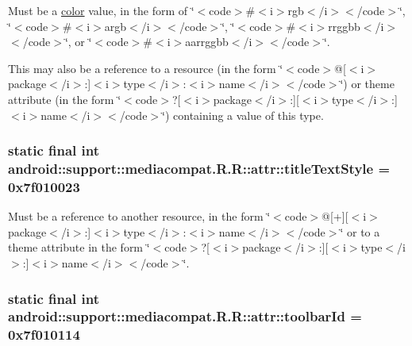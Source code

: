 Must be a \hyperlink{classandroid_1_1support_1_1mediacompat_1_1_r_1_1color}{color} value, in the form of \char`\"{}$<$code$>$\#$<$i$>$rgb$<$/i$>$$<$/code$>$\char`\"{}, \char`\"{}$<$code$>$\#$<$i$>$argb$<$/i$>$$<$/code$>$\char`\"{}, \char`\"{}$<$code$>$\#$<$i$>$rrggbb$<$/i$>$$<$/code$>$\char`\"{}, or \char`\"{}$<$code$>$\#$<$i$>$aarrggbb$<$/i$>$$<$/code$>$\char`\"{}. 

This may also be a reference to a resource (in the form \char`\"{}$<$code$>$@\mbox{[}$<$i$>$package$<$/i$>$:\mbox{]}$<$i$>$type$<$/i$>$:$<$i$>$name$<$/i$>$$<$/code$>$\char`\"{}) or theme attribute (in the form \char`\"{}$<$code$>$?\mbox{[}$<$i$>$package$<$/i$>$:\mbox{]}\mbox{[}$<$i$>$type$<$/i$>$:\mbox{]}$<$i$>$name$<$/i$>$$<$/code$>$\char`\"{}) containing a value of this type. \hypertarget{classandroid_1_1support_1_1mediacompat_1_1_r_1_1attr_0609b590ea704bb265fe0dd66046aa17}{
\subsubsection[{titleTextStyle}]{\setlength{\rightskip}{0pt plus 5cm}static final int android::support::mediacompat.R.R::attr::titleTextStyle = 0x7f010023}}
\label{classandroid_1_1support_1_1mediacompat_1_1_r_1_1attr_0609b590ea704bb265fe0dd66046aa17}


Must be a reference to another resource, in the form \char`\"{}$<$code$>$@\mbox{[}+\mbox{]}\mbox{[}$<$i$>$package$<$/i$>$:\mbox{]}$<$i$>$type$<$/i$>$:$<$i$>$name$<$/i$>$$<$/code$>$\char`\"{} or to a theme attribute in the form \char`\"{}$<$code$>$?\mbox{[}$<$i$>$package$<$/i$>$:\mbox{]}\mbox{[}$<$i$>$type$<$/i$>$:\mbox{]}$<$i$>$name$<$/i$>$$<$/code$>$\char`\"{}. \hypertarget{classandroid_1_1support_1_1mediacompat_1_1_r_1_1attr_c17c5c4366cc8ff75f83d2abec1c7806}{
\subsubsection[{toolbarId}]{\setlength{\rightskip}{0pt plus 5cm}static final int android::support::mediacompat.R.R::attr::toolbarId = 0x7f010114}}
\label{classandroid_1_1support_1_1mediacompat_1_1_r_1_1attr_c17c5c4366cc8ff75f83d2abec1c7806}


